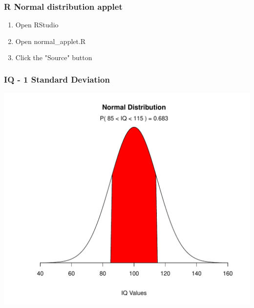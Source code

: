 \documentclass[dvipsnames]{beamer}\usepackage[]{graphicx}\usepackage[]{color}
\makeatletter
\def\maxwidth{ %
  \ifdim\Gin@nat@width>\linewidth
    \linewidth
  \else
    \Gin@nat@width
  \fi
}
\newenvironment{knitrout}{}{} %
\makeatother
\begin{document}
\begin{frame}
\frametitle{R Normal distribution applet}
\begin{enumerate}
\item Open RStudio 
\item Open normal\_applet.R
\item Click the "Source" button
\end{enumerate}
\end{frame}

\begin{frame}
\frametitle{IQ - 1 Standard Deviation}
\begin{knitrout}
\color{fgcolor}

{\centering \includegraphics[width=\maxwidth]{figure/unnamed-chunk-10-1} 

}



\end{knitrout}
\end{frame}
\end{document}
